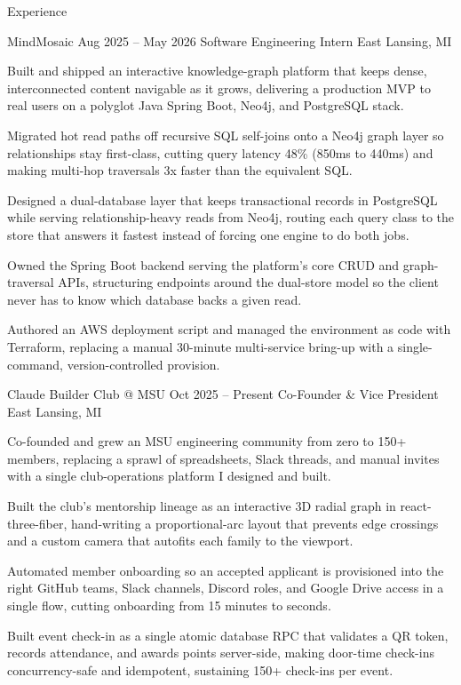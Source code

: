 \documentclass[
	11pt
]{../../../template}
\begin{document}
	\begin{rSection}{E}{xperience}
		\begin{rSectionEntry}
			{MindMosaic}
			{Aug 2025 -- May 2026}
			{Software Engineering Intern}
			{}
			{East Lansing, MI}

			\item Built and shipped an interactive knowledge-graph platform that keeps dense, interconnected content navigable as it grows, delivering a production MVP to real users on a polyglot Java Spring Boot, Neo4j, and PostgreSQL stack.
			\item Migrated hot read paths off recursive SQL self-joins onto a Neo4j graph layer so relationships stay first-class, cutting query latency 48\% (850ms to 440ms) and making multi-hop traversals 3x faster than the equivalent SQL.
			\item Designed a dual-database layer that keeps transactional records in PostgreSQL while serving relationship-heavy reads from Neo4j, routing each query class to the store that answers it fastest instead of forcing one engine to do both jobs.
			\item Owned the Spring Boot backend serving the platform's core CRUD and graph-traversal APIs, structuring endpoints around the dual-store model so the client never has to know which database backs a given read.
			\item Authored an AWS deployment script and managed the environment as code with Terraform, replacing a manual 30-minute multi-service bring-up with a single-command, version-controlled provision.
		\end{rSectionEntry}

		\begin{rSectionEntry}
			{Claude Builder Club @ MSU}
			{Oct 2025 -- Present}
			{Co-Founder \& Vice President}
			{}
			{East Lansing, MI}

			\item Co-founded and grew an MSU engineering community from zero to 150+ members, replacing a sprawl of spreadsheets, Slack threads, and manual invites with a single club-operations platform I designed and built.
			\item Built the club's mentorship lineage as an interactive 3D radial graph in react-three-fiber, hand-writing a proportional-arc layout that prevents edge crossings and a custom camera that autofits each family to the viewport.
			\item Automated member onboarding so an accepted applicant is provisioned into the right GitHub teams, Slack channels, Discord roles, and Google Drive access in a single flow, cutting onboarding from 15 minutes to seconds.
			\item Built event check-in as a single atomic database RPC that validates a QR token, records attendance, and awards points server-side, making door-time check-ins concurrency-safe and idempotent, sustaining 150+ check-ins per event.
		\end{rSectionEntry}
	\end{rSection}
\end{document}
